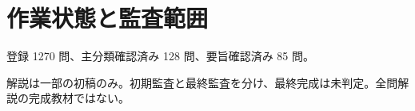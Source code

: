 \chapter{作業状態と監査範囲}
登録 1270 問、主分類確認済み 128 問、要旨確認済み 85 問。
\par 解説は一部の初稿のみ。初期監査と最終監査を分け、最終完成は未判定。全問解説の完成教材ではない。
